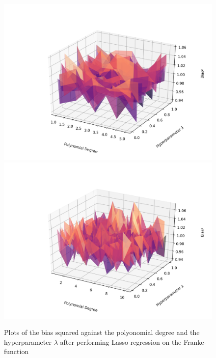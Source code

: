 \documentclass[a4paper,10pt,english]{article}
\begin{document}
\begin{figure}[H]
	\centering 
	\includegraphics[scale=0.47]{../franke_output/part_E_4.png}
	\includegraphics[scale=0.47]{../franke_output/part_E_4_highdeg.png}
	\caption{
		Plots of the bias squared against the polyonomial degree and the hyperparameter $\lambda$ after performing Lasso regression on the Franke-function 
	}
	\label{part_e4}
\end{figure}
\end{document}
